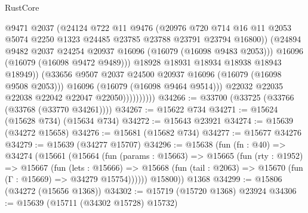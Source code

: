 \begin{lexlean}{RustCore}
\begin{coremodule}
                                @9471
                                @2037
                                (@24124
                                  @722
                                  @11
                                  @9476
                                  (@20976
                                    @720
                                    @714
                                    @16
                                    @11
                                    @2053
                                    @5074
                                    @2250
                                    @1323
                                    @24485
                                    @23785
                                    @23788
                                    @23791
                                    @23794
                                    @16800))
                                (@24894
                                  @9482
                                  @2037
                                  @24254
                                  @20937
                                  @16096
                                  (@16079 (@16098 @9483 @2053)))
                                @16096
                                (@16079 (@16098 @9472 @9489)))
                              @18928
                              @18931
                              @18934
                              @18938
                              @18943
                              @18949))
                          (@33656 @9507 @2037 @24500 @20937 @16096 (@16079 (@16098 @9508 @2053)))
                          @16096
                          (@16079 (@16098 @9464 @9514)))
                        @22032
                        @22035
                        @22038
                        @22042
                        @22047
                        @22050))))))))))
@34266 := @33700 (@33725 (@33766 (@33768 (@33770 @34261))))
@34267 := @15622 @734
@34271 := @15624 (@15628 @734) (@15634 @734)
@34272 := @15643 @23921
@34274 := @15639 (@34272 @15658)
@34276 := @15681 (@15682 @734)
@34277 := @15677 @34276
@34279 := @15639 (@34277 @15707)
@34296 := @15638
    (fun (fn : @40) =>
    @34274
      (@15661
        (@15664
          (fun (params : @15663) =>
          @15665
            (fun (rty : @1952) =>
            @15667
              (fun (lets : @15666) =>
              @15668 (fun (tail : @2063) => @15670 (fun (Γ : @15669) => @34279 @15754))))))
        @15800))
    @1368
@34299 := @15806 (@34272 (@15656 @1368))
@34302 := @15719 (@15720 @1368) @23924
@34306 := @15639 (@15711 (@34302 @15728) @15732)

\end{coremodule}
\end{lexlean}
